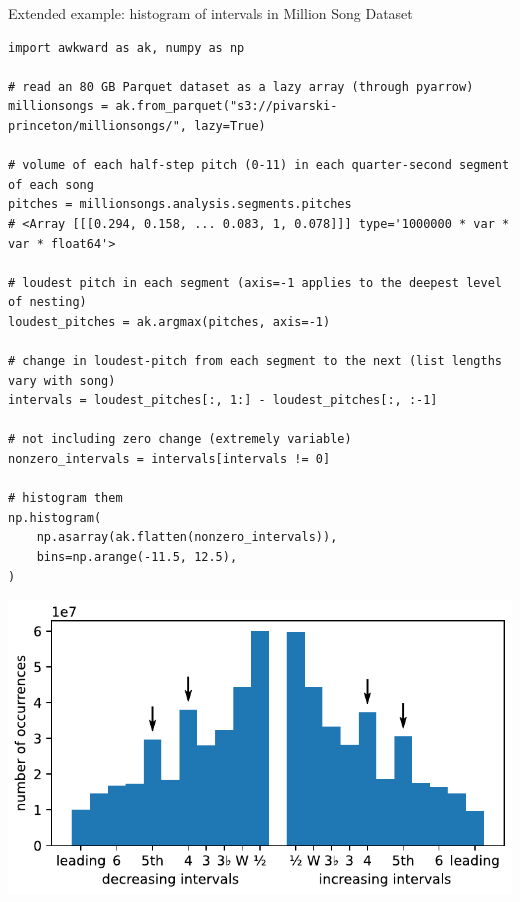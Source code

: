 \documentclass[aspectratio=169]{beamer}
\begin{document}
\begin{frame}[fragile]{Extended example: histogram of intervals in Million Song Dataset}
\vspace{0.2 cm}
\scriptsize
\begin{verbatim}
import awkward as ak, numpy as np

# read an 80 GB Parquet dataset as a lazy array (through pyarrow)
millionsongs = ak.from_parquet("s3://pivarski-princeton/millionsongs/", lazy=True)

# volume of each half-step pitch (0-11) in each quarter-second segment of each song
pitches = millionsongs.analysis.segments.pitches
# <Array [[[0.294, 0.158, ... 0.083, 1, 0.078]]] type='1000000 * var * var * float64'>

# loudest pitch in each segment (axis=-1 applies to the deepest level of nesting)
loudest_pitches = ak.argmax(pitches, axis=-1)

# change in loudest-pitch from each segment to the next (list lengths vary with song)
intervals = loudest_pitches[:, 1:] - loudest_pitches[:, :-1]

# not including zero change (extremely variable)
nonzero_intervals = intervals[intervals != 0]

# histogram them
np.histogram(
    np.asarray(ak.flatten(nonzero_intervals)),
    bins=np.arange(-11.5, 12.5),
)
\end{verbatim}

\vspace{-2.85 cm}
\hfill \includegraphics[width=0.4\linewidth]{million-song-histogram.pdf}
\end{frame}
\end{document}
